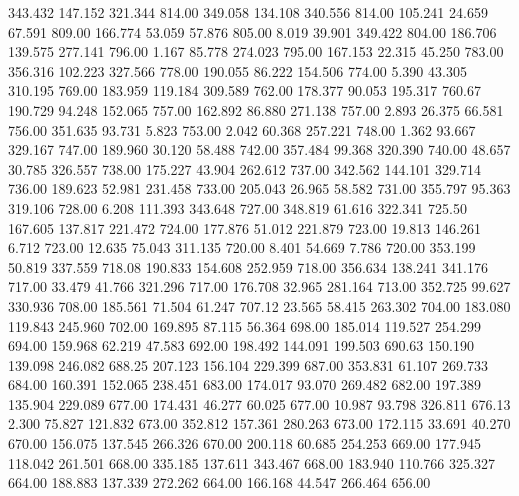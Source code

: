  343.432  147.152  321.344       814.00
 349.058  134.108  340.556       814.00
 105.241   24.659   67.591       809.00
 166.774   53.059   57.876       805.00
   8.019   39.901  349.422       804.00
 186.706  139.575  277.141       796.00
   1.167   85.778  274.023       795.00
 167.153   22.315   45.250       783.00
 356.316  102.223  327.566       778.00
 190.055   86.222  154.506       774.00
   5.390   43.305  310.195       769.00
 183.959  119.184  309.589       762.00
 178.377   90.053  195.317       760.67
 190.729   94.248  152.065       757.00
 162.892   86.880  271.138       757.00
   2.893   26.375   66.581       756.00
 351.635   93.731    5.823       753.00
   2.042   60.368  257.221       748.00
   1.362   93.667  329.167       747.00
 189.960   30.120   58.488       742.00
 357.484   99.368  320.390       740.00
  48.657   30.785  326.557       738.00
 175.227   43.904  262.612       737.00
 342.562  144.101  329.714       736.00
 189.623   52.981  231.458       733.00
 205.043   26.965   58.582       731.00
 355.797   95.363  319.106       728.00
   6.208  111.393  343.648       727.00
 348.819   61.616  322.341       725.50
 167.605  137.817  221.472       724.00
 177.876   51.012  221.879       723.00
  19.813  146.261    6.712       723.00
  12.635   75.043  311.135       720.00
   8.401   54.669    7.786       720.00
 353.199   50.819  337.559       718.08
 190.833  154.608  252.959       718.00
 356.634  138.241  341.176       717.00
  33.479   41.766  321.296       717.00
 176.708   32.965  281.164       713.00
 352.725   99.627  330.936       708.00
 185.561   71.504   61.247       707.12
  23.565   58.415  263.302       704.00
 183.080  119.843  245.960       702.00
 169.895   87.115   56.364       698.00
 185.014  119.527  254.299       694.00
 159.968   62.219   47.583       692.00
 198.492  144.091  199.503       690.63
 150.190  139.098  246.082       688.25
 207.123  156.104  229.399       687.00
 353.831   61.107  269.733       684.00
 160.391  152.065  238.451       683.00
 174.017   93.070  269.482       682.00
 197.389  135.904  229.089       677.00
 174.431   46.277   60.025       677.00
  10.987   93.798  326.811       676.13
   2.300   75.827  121.832       673.00
 352.812  157.361  280.263       673.00
 172.115   33.691   40.270       670.00
 156.075  137.545  266.326       670.00
 200.118   60.685  254.253       669.00
 177.945  118.042  261.501       668.00
 335.185  137.611  343.467       668.00
 183.940  110.766  325.327       664.00
 188.883  137.339  272.262       664.00
 166.168   44.547  266.464       656.00
